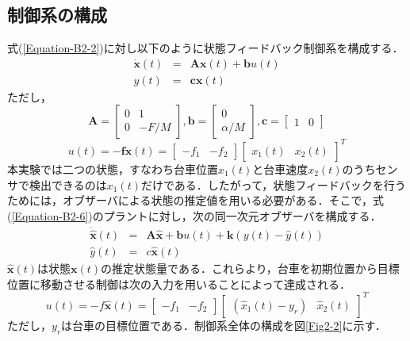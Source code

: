 \documentclass[12pt]{jsarticle}
\begin{document}
\subsection{制御系の構成}
式(\ref{Equation-B2-2})に対し以下のように状態フィードバック制御系を構成する．
\begin{eqnarray}
  \label{Equation-B2-5}
  \dot{\bm x}(t) &=& {\bm A}{\bm x}(t) + {\bm b}u(t) \\
  \label{Equation-B2-6}
  y(t) &=& {\bm c}{\bm x}(t)
\end{eqnarray}
ただし，
\begin{equation}
  \label{Equation-B2-7}
  {\bm A} = \left[\begin{array}{cc}0&1\\ 0&-F/M\end{array}\right], {\bm b} = \left[\begin{array}{c}0\\ \alpha/M\end{array}\right], {\bm c} = [\begin{array}{cc}1&0\end{array}]
\end{equation}
\begin{equation}
  \label{Equation-B2-8}
  u(t) = -{\bm f}{\bm x}(t) = [\begin{array}{cc}-f_1&-f_2\end{array}][\begin{array}{cc}x_1(t)&x_2(t)\end{array}]^T
\end{equation}
本実験では二つの状態，すなわち台車位置$x_1(t)$と台車速度$x_2(t)$のうちセンサで検出できるのは$x_1(t)$だけである．したがって，状態フィードバックを行うためには，オブザーバによる状態の推定値を用いる必要がある．そこで，式(\ref{Equation-B2-6})のプラントに対し，次の同一次元オブザーバを構成する．
\begin{eqnarray}
  \label{Equation-B2-9}
  \dot{\hat{\bm x}}(t) &=& {\bm A} \hat{\bm x} + {\bm b}u(t) + {\bm k}(y(t) - \hat{y}(t)) \\
  \label{Equation-B2-10}
  \hat{y}(t) &=& c\hat{\bm x}(t)
\end{eqnarray}
$\hat{\bm x}(t)$は状態${\bm x}(t)$の推定状態量である．これらより，台車を初期位置から目標位置に移動させる制御は次の入力を用いることによって達成される．
\begin{equation}
  \label{Equation-B2-11}
  u(t) = -f \hat{\bm x}(t) = \left[\begin{array}{cc}-f_1&-f_2\end{array}\right]\left[\begin{array}{cc}(\hat{x}_1(t)-y_r)&\hat{x}_2(t)\end{array}\right]^T
\end{equation}
ただし，$y_r$は台車の目標位置である．制御系全体の構成を図\ref{Fig2-2}に示す．
\end{document}
